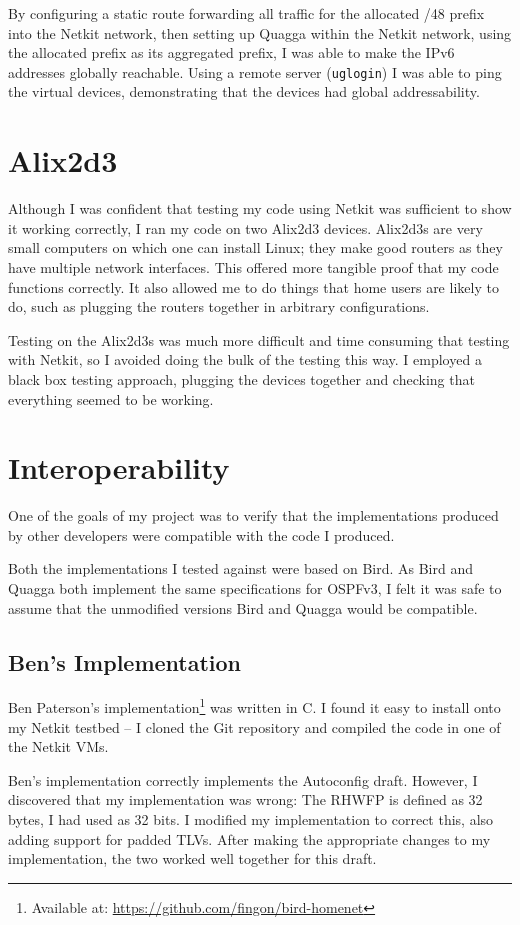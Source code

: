 \documentclass[12pt,a4paper,twoside]{report}
\begin{document}
By configuring a static route forwarding all traffic for the allocated /48
prefix into the Netkit network, then setting up Quagga within the Netkit
network, using the allocated prefix as its aggregated prefix, I was able to
make the IPv6 addresses globally reachable. Using a remote server
(\texttt{uglogin}) I was able to ping the virtual devices, demonstrating that
the devices had global addressability.

\section{Alix2d3}
\label{alix}
Although I was confident that testing my code using Netkit was sufficient to
show it working correctly, I ran my code on two Alix2d3 devices. Alix2d3s are
very small computers on which one can install Linux; they make good routers as
they have multiple network interfaces. This offered more tangible proof
that my code functions correctly. It also allowed me to do things that home
users are likely to do, such as plugging the routers together in arbitrary
configurations.

Testing on the Alix2d3s was much more difficult and time consuming that testing
with Netkit, so I avoided doing the bulk of the testing this way. I employed a
black box testing approach, plugging the devices together and checking that
everything seemed to be working. 

\section{Interoperability}
One of the goals of my project was to verify that the implementations produced
by other developers were compatible with the code I produced. 

Both the implementations I tested against were based on Bird. As Bird and
Quagga both implement the same specifications for OSPFv3, I felt it was safe to
assume that the unmodified versions Bird and Quagga would be compatible. 

\subsection{Ben's Implementation}
Ben Paterson's implementation\footnote{Available at:
\url{https://github.com/fingon/bird-homenet}} was written in C. I found it
easy to install onto my Netkit testbed -- I cloned the Git repository and
compiled the code in one of the Netkit VMs. 

Ben's implementation correctly implements the Autoconfig draft. However, I
discovered that my implementation was wrong: The RHWFP is defined as 32 bytes,
I had used as 32 bits. I modified my implementation to correct this, also
adding support for padded TLVs. After making the appropriate changes to my
implementation, the two worked well together for this draft.
\end{document}
